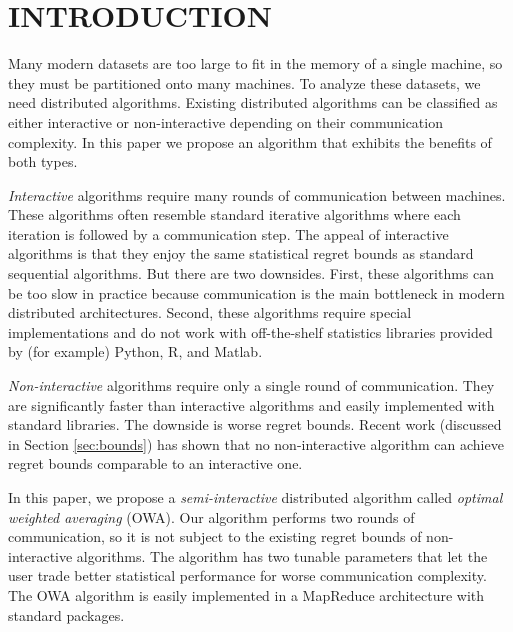 \documentclass[twoside]{article}
\begin{document}

\section{INTRODUCTION}

Many modern datasets are too large to fit in the memory of a single machine,
so they must be partitioned onto many machines.
To analyze these datasets, we need distributed algorithms.
Existing distributed algorithms can be classified as either interactive or non-interactive depending on their communication complexity.
In this paper we propose an algorithm that exhibits the benefits of both types.

\emph{Interactive} algorithms require many rounds of communication between machines.
These algorithms often resemble standard iterative algorithms where each iteration is followed by a communication step.
The appeal of interactive algorithms is that they enjoy the same statistical regret bounds as standard sequential algorithms.
But there are two downsides.
First, these algorithms can be too slow in practice because communication is the main bottleneck in modern distributed architectures.
Second, these algorithms require special implementations and do not work with off-the-shelf statistics libraries provided by (for example) Python, R, and Matlab.

\emph{Non-interactive} algorithms require only a single round of communication.
They are significantly faster than interactive algorithms and  easily implemented with standard libraries.
The downside is worse regret bounds.
Recent work (discussed in Section \ref{sec:bounds}) has shown that no non-interactive algorithm can achieve regret bounds comparable to an interactive one.

In this paper, we propose a \emph{semi-interactive} distributed algorithm called \emph{optimal weighted averaging} (OWA).
Our algorithm performs two rounds of communication,
so it is not subject to the existing regret bounds of non-interactive algorithms.
The algorithm has two tunable parameters that let the user trade better statistical performance for worse communication complexity.
The OWA algorithm is easily implemented in a MapReduce architecture with standard packages.
\end{document}
